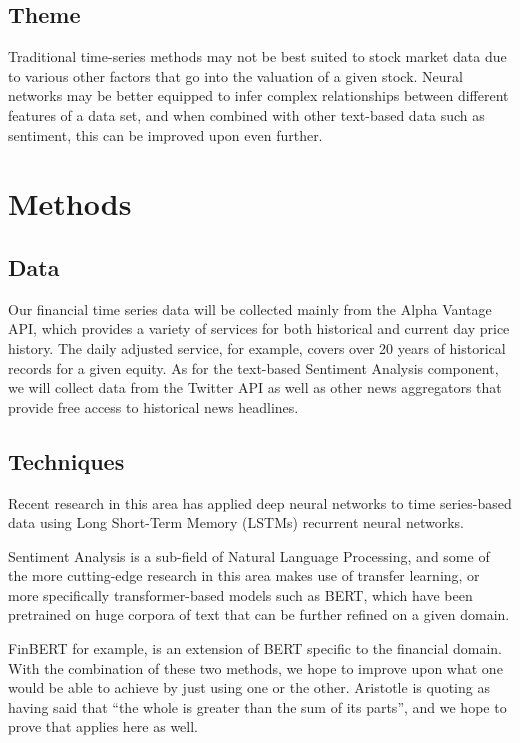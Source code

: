 \documentclass{llncs}
\begin{document}
\subsection{Theme}

Traditional time-series methods may not be best suited to stock market data due to various other factors that go into the valuation of a given stock. Neural networks may be better equipped to infer complex relationships between different features of a data set, and when combined with other text-based data such as sentiment, this can be improved upon even further.


\section{Methods}

\subsection{Data}

Our financial time series data will be collected mainly from the Alpha Vantage API, which provides a variety of services for both historical and current day price history. The daily adjusted service, for example, covers over 20 years of historical records for a given equity. As for the text-based Sentiment Analysis component, we will collect data from the Twitter API as well as other news aggregators that provide free access to historical news headlines.

\subsection{Techniques}

Recent research in this area has applied deep neural networks to time series-based data using Long Short-Term Memory (LSTMs) recurrent neural networks.

Sentiment Analysis is a sub-field of Natural Language Processing, and some of the more cutting-edge research in this area makes use of transfer learning, or more specifically transformer-based models such as BERT, which have been pretrained on huge corpora of text that can be further refined on a given domain.

FinBERT for example, is an extension of BERT specific to the financial domain.
With the combination of these two methods, we hope to improve upon what one would be able to achieve by just using one or the other. Aristotle is quoting as having said that “the whole is greater than the sum of its parts”, and we hope to prove that applies here as well.
\end{document}
